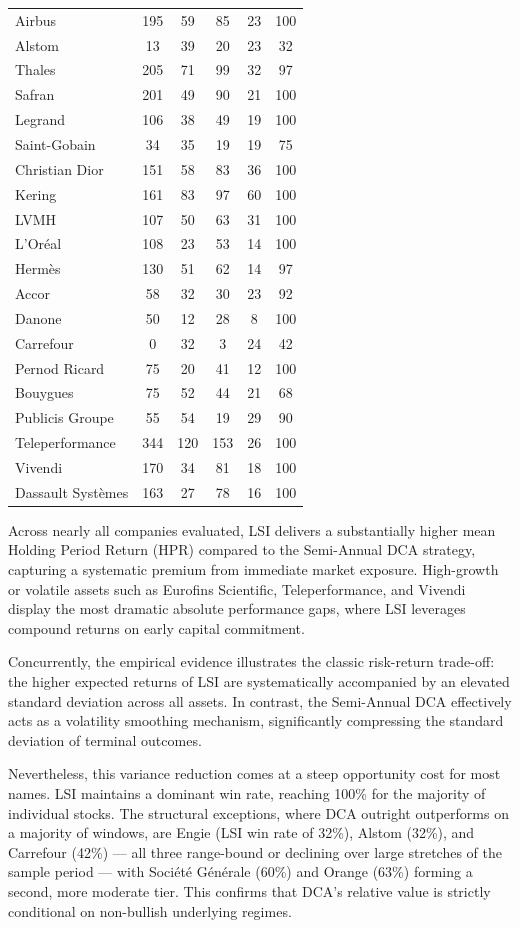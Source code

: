 \documentclass[11pt,a4paper]{article}
\begin{document}
\begin{table}[H]
\begin{tabularx}{\textwidth}{X c c c c c}
Airbus & 195 & 59 & 85 & 23 & 100 \\
Alstom & 13 & 39 & 20 & 23 & 32 \\
Thales & 205 & 71 & 99 & 32 & 97 \\
Safran & 201 & 49 & 90 & 21 & 100 \\
Legrand & 106 & 38 & 49 & 19 & 100 \\
Saint-Gobain & 34 & 35 & 19 & 19 & 75 \\
Christian Dior & 151 & 58 & 83 & 36 & 100 \\
Kering & 161 & 83 & 97 & 60 & 100 \\
LVMH & 107 & 50 & 63 & 31 & 100 \\
L'Oréal & 108 & 23 & 53 & 14 & 100 \\
Hermès & 130 & 51 & 62 & 14 & 97 \\
Accor & 58 & 32 & 30 & 23 & 92 \\
Danone & 50 & 12 & 28 & 8 & 100 \\
Carrefour & 0 & 32 & 3 & 24 & 42 \\
Pernod Ricard & 75 & 20 & 41 & 12 & 100 \\
Bouygues & 75 & 52 & 44 & 21 & 68 \\
Publicis Groupe & 55 & 54 & 19 & 29 & 90 \\
Teleperformance & 344 & 120 & 153 & 26 & 100 \\
Vivendi & 170 & 34 & 81 & 18 & 100 \\
Dassault Systèmes & 163 & 27 & 78 & 16 & 100 \\
\hline
\end{tabularx}
\end{table}


Across nearly all companies evaluated, LSI delivers a substantially higher mean Holding Period Return (HPR) compared to the Semi-Annual DCA strategy, capturing a systematic premium from immediate market exposure. High-growth or volatile assets such as Eurofins Scientific, Teleperformance, and Vivendi display the most dramatic absolute performance gaps, where LSI leverages compound returns on early capital commitment.

Concurrently, the empirical evidence illustrates the classic risk-return trade-off: the higher expected returns of LSI are systematically accompanied by an elevated standard deviation across all assets. In contrast, the Semi-Annual DCA effectively acts as a volatility smoothing mechanism, significantly compressing the standard deviation of terminal outcomes.

Nevertheless, this variance reduction comes at a steep opportunity cost for most names. LSI maintains a dominant win rate, reaching 100\% for the majority of individual stocks. The structural exceptions, where DCA outright outperforms on a majority of windows, are Engie (LSI win rate of 32\%), Alstom (32\%), and Carrefour (42\%) --- all three range-bound or declining over large stretches of the sample period --- with Société Générale (60\%) and Orange (63\%) forming a second, more moderate tier. This confirms that DCA's relative value is strictly conditional on non-bullish underlying regimes.
\end{document}
